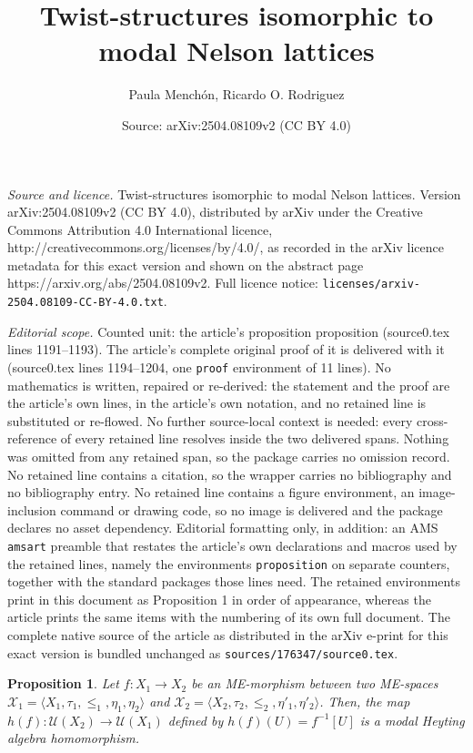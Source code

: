 \documentclass[10pt,a4paper]{amsart}
\title{Twist-structures isomorphic to modal Nelson lattices}
\author{Paula Mench\'on, Ricardo O. Rodriguez}
\date{Source: arXiv:2504.08109v2 (CC BY 4.0)}
\newtheorem{proposition}{Proposition}
\begin{document}
\maketitle

\noindent\emph{Source and licence.} Twist-structures isomorphic to modal Nelson lattices. Version arXiv:2504.08109v2 (CC BY 4.0), distributed by arXiv under the Creative Commons Attribution 4.0 International licence, http://creativecommons.org/licenses/by/4.0/, as recorded in the arXiv licence metadata for this exact version and shown on the abstract page https://arxiv.org/abs/2504.08109v2. Full licence notice: \texttt{licenses/arxiv-2504.08109-CC-BY-4.0.txt}.\par\smallskip

\noindent\textit{Editorial scope.} Counted unit: the article's proposition proposition (source0.tex lines 1191--1193). The article's complete original proof of it is delivered with it (source0.tex lines 1194--1204, one \texttt{proof} environment of 11 lines). No mathematics is written, repaired or re-derived: the statement and the proof are the article's own lines, in the article's own notation, and no retained line is substituted or re-flowed.  No further source-local context is needed: every cross-reference of every retained line resolves inside the two delivered spans.  Nothing was omitted from any retained span, so the package carries no omission record.  No retained line contains a citation, so the wrapper carries no bibliography and no bibliography entry.  No retained line contains a figure environment, an image-inclusion command or drawing code, so no image is delivered and the package declares no asset dependency.  Editorial formatting only, in addition: an AMS \texttt{amsart} preamble that restates the article's own declarations and macros used by the retained lines, namely the environments \texttt{proposition} on separate counters, together with the standard packages those lines need.  The retained environments print in this document as Proposition 1 in order of appearance, whereas the article prints the same items with the numbering of its own full document.  The complete native source of the article as distributed in the arXiv e-print for this exact version is bundled unchanged as \texttt{sources/176347/source0.tex}.
\begin{proposition}
    Let $f \colon X_1\to X_2$ be an ME-morphism	between two ME-spaces $\mathcal{X}_1=\langle X_1,\tau_1,\leq_1,\eta_1,\eta_2\rangle$ and $\mathcal{X}_2=\langle X_2,\tau_2,\leq_2,\eta'_1,\eta'_2\rangle$. Then, the map $h(f) \colon \mathcal{U}(X_2)\to \mathcal{U}(X_1)$ deﬁned by $h(f)(U)=f^{-1}[U]$ is a modal Heyting algebra homomorphism. 
\end{proposition}
\end{document}
